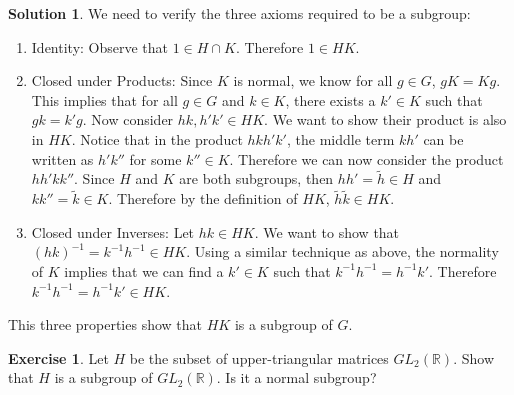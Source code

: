 \documentclass[12pt]{article}
\theoremstyle{definition}
\newtheorem{exercise}{Exercise}
\theoremstyle{definition}
\newtheorem{solution}{Solution}
\newcommand{\R}{\mathbb{R}}
\begin{document}
\begin{solution}
We need to verify the three axioms required to be a subgroup:
\begin{enumerate}
	\item Identity: Observe that $1 \in H \cap K$. Therefore $1 \in HK$.
	\item Closed under Products: Since $K$ is normal, we know for all $g \in G$, $gK = Kg$. This implies that for all $g \in G$ and $k \in K$, there exists a $k' \in K$ such that $gk = k'g$. Now consider $hk, h'k' \in HK$. We want to show their product is also in $HK$. Notice that in the product $hkh'k'$, the middle term $kh'$ can be written as $h'k''$ for some $k'' \in K$. Therefore we can now consider the product $hh'kk''$. Since $H$ and $K$ are both subgroups, then $hh'=\tilde{h} \in H$ and $kk'' = \tilde{k} \in K$. Therefore by the definition of $HK$, $\tilde{h}\tilde{k} \in HK$. 
	\item Closed under Inverses: Let $hk \in HK$. We want to show that $(hk)^{-1} = k^{-1} h^{-1} \in HK$. Using a similar technique as above, the normality of $K$ implies that we can find a $k' \in K$ such that $k^{-1} h^{-1} = h^{-1} k'$. Therefore $k^{-1} h^{-1} = h^{-1} k' \in HK$.
\end{enumerate}
This three properties show that $HK$ is a subgroup of $G$.
\end{solution}

\begin{exercise}
Let $H$ be the subset of upper-triangular matrices $GL_2(\R)$. Show that $H$ is a subgroup of $GL_2(\R)$. Is it a normal subgroup?
\end{exercise}
\end{document}
